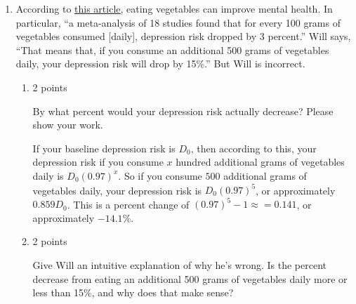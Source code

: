 \documentclass{article}
\makeatletter
\let\@href=\href
\renewcommand{\href}[2]{\@href{#1}{\ul{#2}}}
\makeatother
\begin{document}
\begin{enumerate}
\begin{enumerate}
\begin{enumerate}
    \end{enumerate}

  \item According to \href{https://canvas.harvard.edu/files/21163133/download?download_frd=1}{this article}, eating vegetables can improve mental health. In particular, %
    ``a meta-analysis of 18 studies found that for every 100 grams of vegetables consumed [daily], depression risk dropped by 3 percent.'' Will says, ``That means that, if you consume an additional 500 grams of vegetables daily, your depression risk will drop by 15\%.'' But Will is incorrect.

    \begin{enumerate}
    \item

      \begin{grading}
        2 points
      \end{grading}

      \begin{problem}[\nstretch{1.5}]
        By what percent would your depression risk actually decrease? Please show your work. 
      \end{problem}

      \begin{solution}
        If your baseline depression risk is $D_0$, then according to this, your depression
        risk if you consume $x$ hundred additional grams of vegetables daily 
        is $D_0(0.97)^x$. So
        if you consume $500$ additional grams of vegetables daily, your depression risk
        is $D_0(0.97)^5$, or approximately $0.859D_0$. This is a percent change
        of $(0.97)^5-1 \approx =0.141$, or approximately $-14.1\%$.
      \end{solution}

    \item

      \begin{grading}
        2 points
      \end{grading}

      \begin{problem}[\vfill]
        Give Will an intuitive explanation of why he's wrong. Is the percent decrease from eating an additional 500 grams of vegetables daily more or less than 15\%, and why does that make sense? 
      \end{problem}


\end{enumerate}
\end{enumerate}
\end{enumerate}
\end{document}

